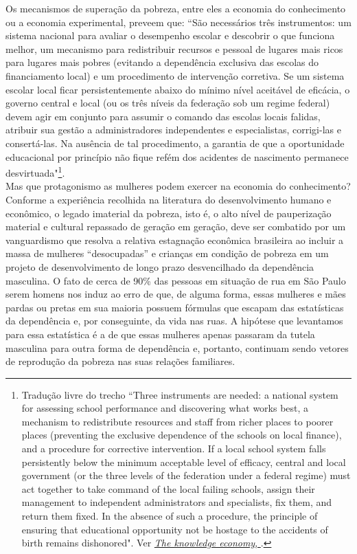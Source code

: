 \documentclass[14pt]{extarticle}
\begin{document}
Os mecanismos de superação da pobreza, entre eles a economia do conhecimento ou a economia experimental, preveem que: ``São necessários três instrumentos: um sistema nacional para avaliar o desempenho escolar e descobrir o que funciona melhor, um mecanismo para redistribuir recursos e pessoal de lugares mais ricos para lugares mais pobres (evitando a dependência exclusiva das escolas do financiamento local) e um procedimento de intervenção corretiva. Se um sistema escolar local ficar persistentemente abaixo do mínimo nível aceitável de eficácia, o governo central e local (ou os três níveis da federação sob um regime federal) devem agir em conjunto para assumir o comando das escolas locais falidas, atribuir sua gestão a administradores independentes e especialistas, corrigi-las e consertá-las. Na ausência de tal procedimento, a garantia de que a oportunidade educacional por princípio não fique refém dos acidentes de nascimento permanece desvirtuada"\footnote{Tradução livre do trecho ``Three instruments are needed: a national system for assessing school performance and discovering what works best, a mechanism to redistribute resources and staff from richer places to poorer places (preventing the exclusive dependence of the schools on local finance), and a procedure for corrective intervention. If a local school system falls persistently below the minimum acceptable level of efficacy, central and local government (or the three levels of the federation under a federal regime) must act together to take command of the local failing schools, assign their management to independent administrators and specialists, fix them, and return them fixed. In the absence of such a procedure, the principle of ensuring that educational opportunity not be hostage to the accidents of birth remains dishonored". Ver \href{https://www.oecd.org/naec/THE-KNOWLEDGE-ECONOMY.pdf}{\textit{The knowledge economy}, \citep[p. 41]{unger}}.}.\\ 

Mas que protagonismo as mulheres podem exercer na economia do conhecimento? Conforme a experiência recolhida na literatura do desenvolvimento humano e econômico, o legado imaterial da pobreza, isto é, o alto nível de pauperização material e cultural repassado de geração em geração, deve ser combatido por um vanguardismo que resolva a relativa estagnação econômica brasileira ao incluir a massa de mulheres ``desocupadas'' e crianças em condição de pobreza em um projeto de desenvolvimento de longo prazo desvencilhado da dependência masculina. O fato de cerca de 90\% das pessoas em situação de rua em São Paulo serem homens nos induz ao erro de que, de alguma forma, essas mulheres e mães pardas ou pretas em sua maioria possuem fórmulas que escapam das estatísticas da dependência e, por conseguinte, da vida nas ruas. A hipótese que levantamos para essa estatística é a de que essas mulheres apenas passaram da tutela masculina para outra forma de dependência e, portanto, continuam sendo vetores de reprodução da pobreza nas suas relações familiares.\\
\end{document}
